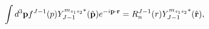 \begin{equation}
\int d^{3}\mathbf{p}f^{J-1}(p)Y_{J-1}^{m_{s_{1}s_{2}}\ast }(\hat{\mathbf{%
p}})e^{-i\mathbf{p}\cdot \mathbf{r}}=R_{n}^{J-1}(r)Y_{J-1}^{m_{s_{1}s_{2}}%
\ast }(\hat{\mathbf{r}}),
\end{equation}

